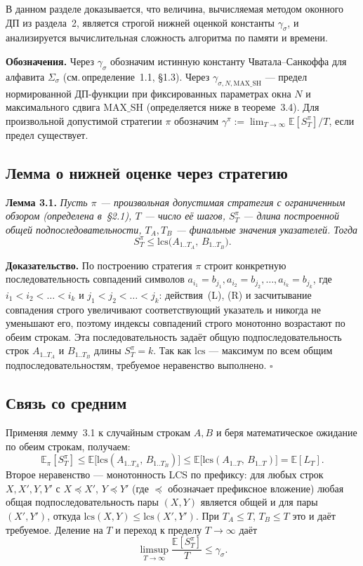 В данном разделе доказывается, что величина, вычисляемая методом оконного ДП из раздела~2, является строгой нижней оценкой константы $\gamma_\sigma$, и анализируется вычислительная сложность алгоритма по памяти и времени.

\smallskip

\textbf{Обозначения.} Через $\gamma_\sigma$ обозначим истинную константу Чватала--Санкоффа для алфавита $\Sigma_\sigma$ (см.\,определение~1.1, \S1.3). Через $\gamma_{\sigma, N, \mathrm{MAX\_SH}}$ --- предел нормированной ДП-функции при фиксированных параметрах окна $N$ и максимального сдвига $\mathrm{MAX\_SH}$ (определяется ниже в теореме~3.4). Для произвольной допустимой стратегии $\pi$ обозначим $\gamma^\pi := \lim_{T \to \infty} \mathbb{E}[S_T^\pi]/T$, если предел существует.

\subsection{Лемма о нижней оценке через стратегию}

\textbf{Лемма 3.1.} \emph{Пусть $\pi$ --- произвольная допустимая стратегия с ограниченным обзором (определена в~\S2.1), $T$ --- число её шагов, $S_T^\pi$ --- длина построенной общей подпоследовательности, $T_A, T_B$ --- финальные значения указателей. Тогда}
\[
    S_T^\pi \leq \mathrm{lcs}\bigl(A_{1..T_A},\, B_{1..T_B}\bigr).
\]

\textbf{Доказательство.} По построению стратегия $\pi$ строит конкретную последовательность совпадений символов $a_{i_1} = b_{j_1}, a_{i_2} = b_{j_2}, \ldots, a_{i_k} = b_{j_k}$, где $i_1 < i_2 < \ldots < i_k$ и $j_1 < j_2 < \ldots < j_k$: действия~(L), (R) и засчитывание совпадения строго увеличивают соответствующий указатель и никогда не уменьшают его, поэтому индексы совпадений строго монотонно возрастают по обеим строкам. Эта последовательность задаёт общую подпоследовательность строк $A_{1..T_A}$ и $B_{1..T_B}$ длины $S_T^\pi = k$. Так как $\mathrm{lcs}$ --- максимум по всем общим подпоследовательностям, требуемое неравенство выполнено. \hfill$\square$

\subsection{Связь со средним}

Применяя лемму~3.1 к случайным строкам $A, B$ и беря математическое ожидание по обеим строкам, получаем:
\[
    \mathbb{E}_\pi[S_T^\pi] \leq \mathbb{E}\bigl[\mathrm{lcs}(A_{1..T_A},\, B_{1..T_B})\bigr] \leq \mathbb{E}\bigl[\mathrm{lcs}(A_{1..T},\, B_{1..T})\bigr] = \mathbb{E}[L_T].
\]
Второе неравенство --- монотонность LCS по префиксу: для любых строк $X, X', Y, Y'$ с $X \preceq X'$, $Y \preceq Y'$ (где $\preceq$ обозначает префиксное вложение) любая общая подпоследовательность пары $(X, Y)$ является общей и для пары $(X', Y')$, откуда $\mathrm{lcs}(X, Y) \leq \mathrm{lcs}(X', Y')$. При $T_A \leq T$, $T_B \leq T$ это и даёт требуемое. Деление на $T$ и переход к пределу $T \to \infty$ даёт
\[
    \limsup_{T \to \infty} \frac{\mathbb{E}[S_T^\pi]}{T} \leq \gamma_\sigma.
\]

